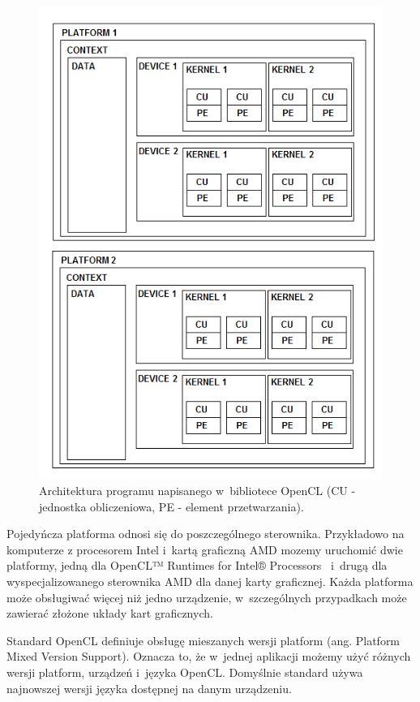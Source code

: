 \begin{figure}[H]
        \centering
                \centering
                \includegraphics[width=12cm]{rys8}
	\caption{Architektura programu napisanego w~bibliotece OpenCL (CU - jednostka obliczeniowa, PE - element przetwarzania).}
\end{figure}

Pojedyńcza platforma odnosi się do poszczególnego sterownika. Przykładowo na komputerze z procesorem Intel i~kartą graficzną AMD mozemy uruchomić dwie platformy, jedną dla OpenCL™ Runtimes for Intel® Processors~\cite{b22} i~drugą dla wyspecjalizowanego sterownika AMD dla danej karty graficznej. Każda platforma może obsługiwać więcej niż jedno urządzenie, w~szczególnych przypadkach może zawierać złożone układy kart graficznych. 

Standard OpenCL definiuje obsługę mieszanych wersji platform (ang. Platform Mixed Version Support). Oznacza to, że w~jednej aplikacji możemy użyć różnych wersji platform, urządzeń i~języka OpenCL. Domyślnie standard używa najnowszej wersji języka dostępnej na danym urządzeniu.

